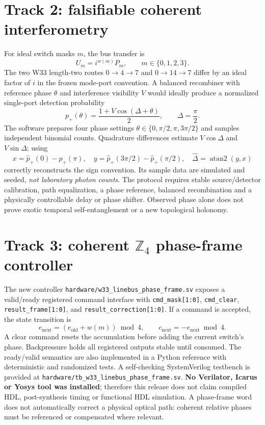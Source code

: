 \documentclass[10pt]{article}
\begin{document}
\section{Track 2: falsifiable coherent interferometry}
For ideal switch masks $m$, the bus transfer is
\[
U_m=i^{w(m)}P_m,\qquad m\in\{0,1,2,3\}.
\]
The two W33 length-two routes
$0\rightarrow4\rightarrow7$ and $0\rightarrow14\rightarrow7$
differ by an ideal factor of $i$ in the frozen mode-port
convention. A balanced recombiner with reference phase
$\theta$ and interference visibility $V$ would ideally
produce a normalized single-port detection probability
\[
p_+(\theta)=\frac{1+V\cos(\Delta+\theta)}2,
\qquad \Delta=\frac{\pi}{2}.
\]
The software prepares four phase settings
$\theta\in\{0,\pi/2,\pi,3\pi/2\}$ and samples independent
binomial counts. Quadrature differences estimate
$V\cos\Delta$ and $V\sin\Delta$; using
\[
x=\hat p_+(0)-\hat p_+(\pi),\quad
y=\hat p_+(3\pi/2)-\hat p_+(\pi/2),
\quad \hat\Delta=\operatorname{atan2}(y,x)
\]
correctly reconstructs the sign convention. Its sample data
are simulated and seeded, \emph{not laboratory photon counts}.
The protocol requires stable source/detector calibration,
path equalization, a phase reference, balanced recombination
and a physically controllable delay or phase shifter.
Observed phase alone does not prove exotic temporal
self-entanglement or a new topological holonomy.

\section{Track 3: coherent $\mathbb{Z}_4$ phase-frame controller}
The new controller
\texttt{hardware/w33\_linebus\_phase\_frame.sv}
exposes a valid/ready registered command interface with
\texttt{cmd\_mask[1:0]}, \texttt{cmd\_clear},
\texttt{result\_frame[1:0]}, and
\texttt{result\_correction[1:0]}. If a command is
accepted, the state transition is
\[
e_{\mathrm{next}}
=(e_{\mathrm{old}}+w(m))\bmod4,
\qquad c_{\mathrm{next}}=-e_{\mathrm{next}}\bmod4.
\]
A clear command resets the accumulation before adding the
current switch's phase. Backpressure holds all registered
outputs stable until consumed. The ready/valid semantics are
also implemented in a Python reference with deterministic and
randomized tests. A self-checking SystemVerilog testbench is
provided at \texttt{hardware/tb\_w33\_linebus\_phase\_frame.sv}.
\textbf{No Verilator, Icarus or Yosys tool was installed}; therefore
this release does not claim compiled HDL, post-synthesis timing
or functional HDL simulation. A phase-frame word does not
automatically correct a physical optical path: coherent
relative phases must be referenced or compensated where relevant.
\end{document}
